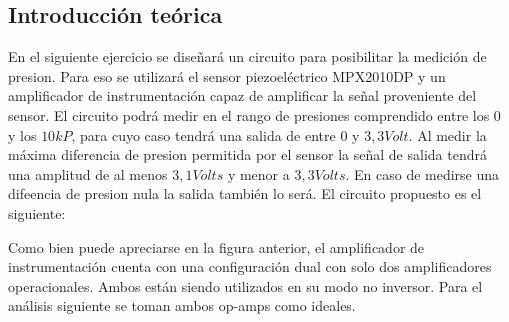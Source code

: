 \documentclass[a4paper]{article}
\begin{document}
\subsection{Introducción teórica}

En el siguiente ejercicio se diseñará un circuito para posibilitar la medición de presion. Para eso se utilizará el sensor piezoeléctrico MPX2010DP y un amplificador de instrumentación capaz de amplificar la señal proveniente del sensor. El circuito podrá medir en el rango de presiones comprendido entre los $0$ y los $10kP$, para cuyo caso tendrá una salida de entre $0$ y $3,3 Volt$. Al medir la máxima diferencia de presion permitida por el sensor la señal de salida tendrá una amplitud de al menos $3,1 Volts$ y menor a $3,3 Volts$. En caso de medirse una difeencia de presion nula la salida también lo será. El circuito propuesto es el siguiente:



Como bien puede apreciarse en la figura anterior, el amplificador de instrumentación cuenta con una configuración dual con solo dos amplificadores operacionales. Ambos están siendo utilizados en su modo no inversor. Para el análisis siguiente se toman ambos op-amps como ideales.

\end{document}
